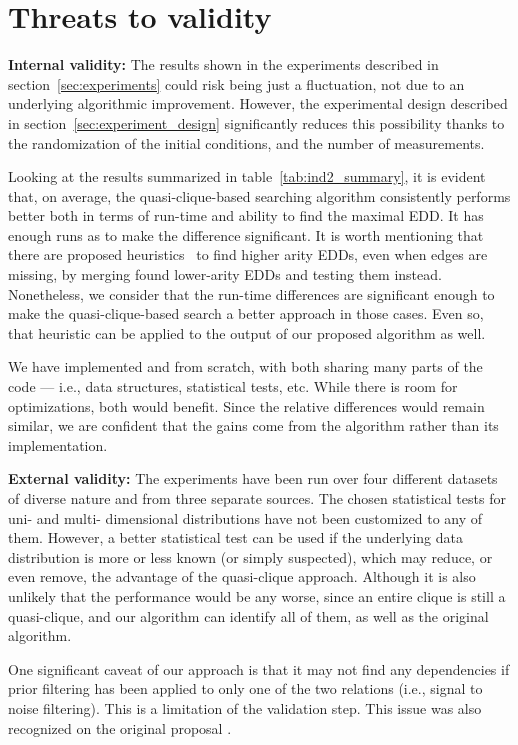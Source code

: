 \section{Threats to validity}
\label{sec:threats}

\textbf{Internal validity:} The results shown in the
experiments described in section~\ref{sec:experiments} could risk being just a fluctuation,
not due to an underlying algorithmic improvement. However,
the experimental design described in section~\ref{sec:experiment_design} significantly reduces
this possibility thanks to the randomization of the initial conditions,
and the number of measurements.

Looking at the results summarized in table~\ref{tab:ind2_summary},
it is evident that, on average, the quasi-clique-based searching algorithm consistently performs
better both in terms of run-time and ability to find the maximal EDD.
It has enough runs as to make the difference significant.
It is worth mentioning that there are proposed heuristics~\cite{koeller2003discovery} to find higher
arity EDDs, even when edges are missing, by merging found lower-arity EDDs and testing them
instead.
Nonetheless, we consider that the run-time differences are significant enough to make
the quasi-clique-based search a better approach in those cases.
Even so, that heuristic can be applied to the output of our proposed algorithm as well.

We have implemented \Find and \PresQ from scratch, with both sharing 
many parts of the code --- i.e., data structures, statistical tests, etc.
While there is room for optimizations, both would benefit.
Since the relative differences would remain similar, we are confident that the gains come from the 
algorithm rather than its implementation.

\textbf{External validity:} The experiments have been run over four different datasets of
diverse nature and from three separate sources. The chosen statistical tests for
uni- and multi- dimensional distributions have not been customized to any of them.
However, a better statistical test can be used if the underlying data distribution is more or
less known (or simply suspected), which may reduce, or even remove, the advantage of the
quasi-clique approach. Although it is also unlikely that the performance would be any worse,
since an entire clique is still a quasi-clique, and our algorithm can identify all of them, as
well as the original \Find algorithm.

One significant caveat of our approach is that it may not find
any dependencies if prior filtering has been applied to only one of the two relations
(i.e., signal to noise filtering). This is a limitation of the validation
step. This issue was also recognized on the original \Find
proposal \cite{koeller2003discovery}.

